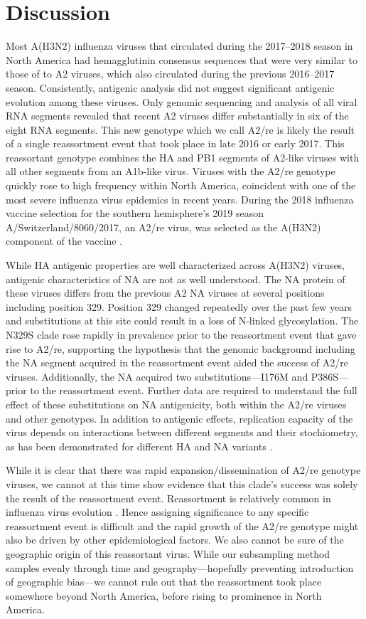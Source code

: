 \section*{Discussion}
Most A(H3N2) influenza viruses that circulated during the 2017--2018 season in North America had hemagglutinin consensus sequences that were very similar to those of to A2 viruses, which also circulated during the previous 2016--2017 season.
Consistently, antigenic analysis did not suggest significant antigenic evolution among these viruses.
Only genomic sequencing and analysis of all viral RNA segments revealed that recent A2 viruses differ substantially in six of the eight RNA segments.
This new genotype which we call A2/re is likely the result of a single reassortment event that took place in late 2016 or early 2017.
This reassortant genotype combines the HA and PB1 segments of A2-like viruses with all other segments from an A1b-like virus.
Viruses with the A2/re genotype quickly rose to high frequency within North America, coincident with one of the most severe influenza virus epidemics in recent years.
During the 2018 influenza vaccine selection for the southern hemisphere’s 2019 season A/Switzerland/8060/2017, an A2/re virus, was selected as the A(H3N2) component of the vaccine \citep{barr_epidemiological_2010}.

While HA antigenic properties are well characterized across A(H3N2) viruses, antigenic characteristics of NA are not as well understood.
The NA protein of these viruses differs from the previous A2 NA viruses at several positions including position 329.
Position 329 changed repeatedly over the past few years and substitutions at this site could result in a loss of N-linked glycosylation.
The N329S clade rose rapidly in prevalence prior to the reassortment event that gave rise to A2/re, supporting the hypothesis that the genomic background including the NA segment acquired in the reassortment event aided the success of A2/re viruses.
Additionally, the NA acquired two substitutions---I176M and P386S---prior to the reassortment event.
Further data are required to understand the full effect of these substitutions on NA antigenicity, both within the A2/re viruses and other genotypes.
In addition to antigenic effects, replication capacity of the virus depends on interactions between different segments and their stochiometry, as has been demonstrated for different HA and NA variants \citep{Yen14264}.

While it is clear that there was rapid expansion/dissemination of A2/re genotype viruses, we cannot at this time show evidence that this clade’s success was solely the result of the reassortment event.
Reassortment is relatively common in influenza virus evolution \citep{10.1371/journal.pbio.0030300, 0.1371/journal.ppat.1000012}.
Hence assigning significance to any specific reassortment event is difficult and the rapid growth of the A2/re genotype might also be driven by other epidemiological factors.
We also cannot be sure of the geographic origin of this reassortant virus.
While our subsampling method samples evenly through time and geography---hopefully preventing introduction of geographic bias---we cannot rule out that the reassortment took place somewhere beyond North America, before rising to prominence in North America.

